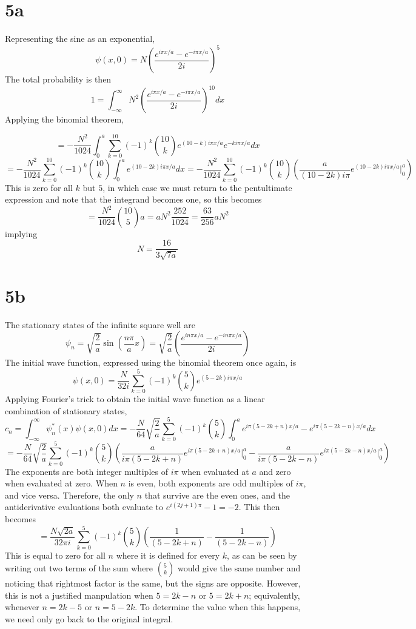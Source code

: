 \documentclass{article}
\begin{document}
\section*{5a}
Representing the sine as an exponential,
\[\psi(x,0)=N\left( \frac{e^{i\pi x/a}-e^{-i\pi x/a}}{2i} \right)^{5}\]
The total probability is then
\[1=\int_{-\infty}^{\infty}N^{2}\left( \frac{e^{i\pi x/a}-e^{-i\pi x/a}}{2i} \right)^{10}dx\]
Applying the binomial theorem,

\[=-\frac{N^{2}}{1024}\int_{0}^{a}\sum_{k=0}^{10}(-1)^{k}\binom{10}{k}e^{(10-k)i\pi x/a}e^{-ki\pi x/a}dx\]
\[=-\frac{N^{2}}{1024}\sum_{k=0}^{10}(-1)^{k}\binom{10}{k}\int_{0}^{a}e^{(10-2k)i\pi x/a}dx=-\frac{N^{2}}{1024}\sum_{k=0}^{10}(-1)^{k}\binom{10}{k}\left( \frac{a}{(10-2k) i\pi}e^{(10-2k)i\pi x/a}\bigg|_{0}^{a} \right)\]
This is zero for all $k$ but $5$, in which case we must return to the pentultimate expression and note that the integrand becomes one, so this becomes
\[=\frac{N^{2}}{1024}\binom{10}{5}a=aN^{2}\frac{252}{1024}=\frac{63}{256}aN^{2}\]
implying
\[N=\frac{16}{3\sqrt{7a}}\]
\section*{5b}
The stationary states of the infinite square well are
\[\psi_{n}=\sqrt{\frac{2}{a}}\sin\left( \frac{n\pi}{a}x \right)=\sqrt{\frac{2}{a}}\left( \frac{e^{in\pi x/a}-e^{-in\pi x/a}}{2i} \right)\]
The initial wave function, expressed using the binomial theorem once again, is
\[\psi(x,0)=\frac{N}{32i}\sum_{k=0}^{5}(-1)^{k}\binom{5}{k}e^{(5-2k)i\pi x/a}\]
Applying Fourier's trick to obtain the initial wave function as a linear combination of stationary states,
\[c_{n}=\int_{-\infty}^{\infty}\psi_{n}^{*}(x)\psi(x,0)dx=-\frac{N}{64}\sqrt{\frac{2}{a}}\sum_{k=0}^{5}(-1)^{k}\binom{5}{k}\int_{0}^{a}e^{i\pi (5-2k+n)x/a}-e^{i\pi(5-2k-n)x/a}dx\]
\[=-\frac{N}{64}\sqrt{\frac{2}{a}}\sum_{k=0}^{5}(-1)^{k}\binom{5}{k}\left( \frac{a}{i\pi(5-2k+n)}e^{i\pi(5-2k+n)x/a}\bigg|_{0}^{a}-\frac{a}{i\pi(5-2k-n)}e^{i\pi(5-2k-n) x/a}\bigg|_{0}^{a} \right)\]
The exponents are both integer multiples of $i\pi$ when evaluated at $a$ and zero when evaluated at zero. When $n$ is even, both exponents are odd multiples of $i\pi$, and vice versa. Therefore, the only $n$ that survive are the even ones, and the antiderivative evaluations both evaluate to $e^{i(2j+1)\pi}-1=-2$.
This then becomes
\[=\frac{ N\sqrt{{2}{a}}}{32\pi i}\sum_{k=0}^{5}(-1)^{k}\binom{5}{k}\left( \frac{1}{(5-2k+n)}-\frac{1}{(5-2k-n)} \right)\]
This is equal to zero for all $n$ where it is defined for every $k$, as can be seen by writing out two terms of the sum where $\binom{5}{k}$ would give the same number and noticing that rightmost factor is the same, but the signs are opposite.
However, this is not a justified manpulation when $5=2k-n$ or $5=2k+n$; equivalently, whenever $n=2k-5$ or $n=5-2k$. To determine the value when this happens, we need only go back to the original integral.
\end{document}
